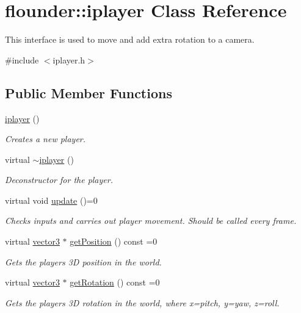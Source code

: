\hypertarget{classflounder_1_1iplayer}{}\section{flounder\+:\+:iplayer Class Reference}
\label{classflounder_1_1iplayer}


This interface is used to move and add extra rotation to a camera.  




{\ttfamily \#include $<$iplayer.\+h$>$}

\subsection*{Public Member Functions}
\begin{DoxyCompactItemize}
\item 
\hyperlink{classflounder_1_1iplayer_a5059d646c0397251c493c19c9a64f15a}{iplayer} ()
\begin{DoxyCompactList}\small\item\em Creates a new player. \end{DoxyCompactList}\item 
virtual \hyperlink{classflounder_1_1iplayer_af9dfb4e8585b475cc3178284e6815be1}{$\sim$iplayer} ()
\begin{DoxyCompactList}\small\item\em Deconstructor for the player. \end{DoxyCompactList}\item 
virtual void \hyperlink{classflounder_1_1iplayer_a763358c47f9d9433b0ce467418492038}{update} ()=0
\begin{DoxyCompactList}\small\item\em Checks inputs and carries out player movement. Should be called every frame. \end{DoxyCompactList}\item 
virtual \hyperlink{classflounder_1_1vector3}{vector3} $\ast$ \hyperlink{classflounder_1_1iplayer_a4e1ed034ef9590feccaaeec519cdf43b}{get\+Position} () const =0
\begin{DoxyCompactList}\small\item\em Gets the players 3D position in the world. \end{DoxyCompactList}\item 
virtual \hyperlink{classflounder_1_1vector3}{vector3} $\ast$ \hyperlink{classflounder_1_1iplayer_ae86318c75ebf593561cbbd82a94ef822}{get\+Rotation} () const =0
\begin{DoxyCompactList}\small\item\em Gets the players 3D rotation in the world, where x=pitch, y=yaw, z=roll. \end{DoxyCompactList}\end{DoxyCompactItemize}


